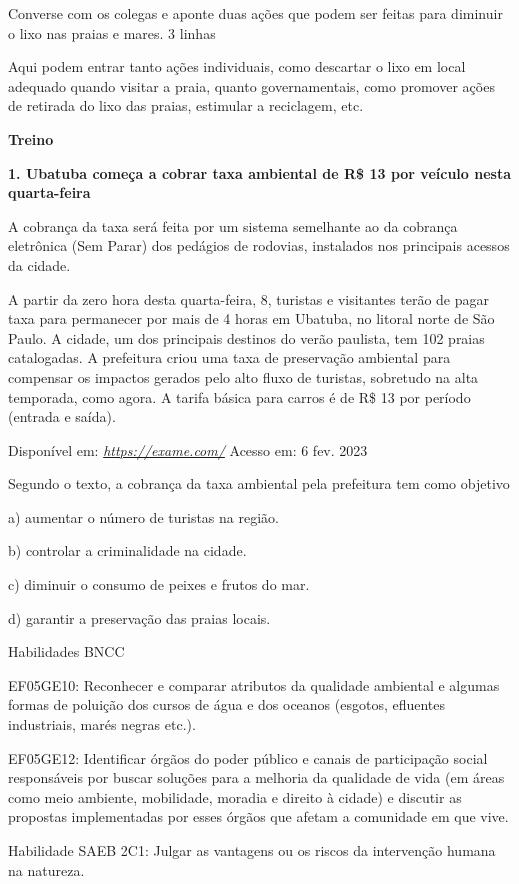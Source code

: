 Converse com os colegas e aponte duas ações que podem ser feitas para
diminuir o lixo nas praias e mares. 3 linhas

Aqui podem entrar tanto ações individuais, como descartar o lixo em
local adequado quando visitar a praia, quanto governamentais, como
promover ações de retirada do lixo das praias, estimular a reciclagem,
etc.

\textbf{Treino }

\textbf{1. Ubatuba começa a cobrar taxa ambiental de R\$ 13 por veículo
nesta quarta-feira}

A cobrança da taxa será feita por um sistema semelhante ao da cobrança
eletrônica (Sem Parar) dos pedágios de rodovias, instalados nos
principais acessos da cidade.

A partir da zero hora desta quarta-feira, 8, turistas e visitantes terão
de pagar taxa para permanecer por mais de 4 horas em Ubatuba, no litoral
norte de São Paulo. A cidade, um dos principais destinos do verão
paulista, tem 102 praias catalogadas. A prefeitura criou uma taxa de
preservação ambiental para compensar os impactos gerados pelo alto fluxo
de turistas, sobretudo na alta temporada, como agora. A tarifa básica
para carros é de R\$ 13 por período (entrada e saída).

Disponível em: \href{https://exame.com/}{\emph{https://exame.com/}}
Acesso em: 6 fev. 2023

Segundo o texto, a cobrança da taxa ambiental pela prefeitura tem como
objetivo

a) aumentar o número de turistas na região.

b) controlar a criminalidade na cidade.

c) diminuir o consumo de peixes e frutos do mar.

d) garantir a preservação das praias locais.

Habilidades BNCC

EF05GE10: Reconhecer e comparar atributos da qualidade ambiental e
algumas formas de poluição dos cursos de água e dos oceanos (esgotos,
efluentes industriais, marés negras etc.).

EF05GE12: Identificar órgãos do poder público e canais de participação
social responsáveis por buscar soluções para a melhoria da qualidade de
vida (em áreas como meio ambiente, mobilidade, moradia e direito à
cidade) e discutir as propostas implementadas por esses órgãos que
afetam a comunidade em que vive.

Habilidade SAEB 2C1: Julgar as vantagens ou os riscos da intervenção
humana na natureza.


